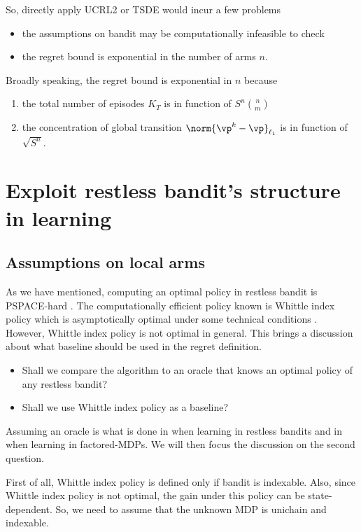 So, directly apply UCRL2 or TSDE would incur a few problems
\begin{itemize}
    \item the assumptions on bandit may be computationally infeasible to check
    \item the regret bound is exponential in the number of arms $n$.
\end{itemize}
Broadly speaking, the regret bound is exponential in $n$ because
\begin{enumerate}[label=(\roman*)]
    \item \label{it:KT} the total number of episodes $K_T$ is in function of $S^n{n \choose m}$
    \item \label{it:concentration} the concentration of global transition $\norm{\vp^k-\vp}_{\ell_1}$ is in function of $\sqrt{S^n}$.
\end{enumerate}

\section{Exploit restless bandit's structure in learning}
\label{ch:restless:sec:structure}

\subsection{Assumptions on local arms}

As we have mentioned, computing an optimal policy in restless bandit is PSPACE-hard \cite{papadimitriou1994complexity}.
The computationally efficient policy known is Whittle index policy which is asymptotically optimal under some technical conditions \cite{weber1990index}.
However, Whittle index policy is not optimal in general.
This brings a discussion about what baseline should be used in the regret definition.
\begin{itemize}
    \item Shall we compare the algorithm to an oracle that knows an optimal policy of any restless bandit?
    \item Shall we use Whittle index policy as a baseline?
\end{itemize}
Assuming an oracle is what is done in \cite{ortner2012regret, jung2019thompson, wang2020restless} when learning in restless bandits and in \cite{osband2014near, rosenberg2020oracle, xu2020reinforcement} when learning in factored-MDPs.
We will then focus the discussion on the second question.

First of all, Whittle index policy is defined only if bandit is indexable.
Also, since Whittle index policy is not optimal, the gain under this policy can be state-dependent.
So, we need to assume that the unknown MDP is unichain and indexable.

